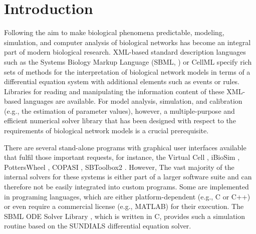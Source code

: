 \documentclass{bioinfo}
\begin{document}
\section{Introduction}

Following the aim to make biological phenomena predictable, modeling, 
simulation, and computer analysis of biological networks has become an integral
part of modern biological research. XML-based standard description languages
such as the Systems Biology Markup Language (SBML, \citealt{Hucka2003}) or
CellML \citep{Lloyd2004} specify rich sets of methods for the interpretation
of biological network models in terms of a differential equation system with
additional elements such as events or rules.
Libraries for reading and manipulating the information content of
these XML-based languages are available.
For model analysis, simulation, and calibration (e.g., the
estimation of parameter values), however, a multiple-purpose and 
efficient numerical solver library that has been designed with respect to the
requirements of biological network models is a crucial prerequisite.

There are several stand-alone programs with
graphical user interfaces available that fulfil those important requests, for
instance, the Virtual Cell \citep{Loew2001}, iBioSim \citep{Myers2009},
PottersWheel \citep{Maiwald2008}, COPASI \citep{Hoops2006}, SBToolbox2
\citep{SBT_Schmidt2006}.
However, The vast majority of the internal solvers for
these systems is either part of a larger software suite and can therefore not
be easily integrated into custom programs. Some are implemented in programing
languages, which are either platform-dependent (e.g., C or C++) or even require
a commercial license (e.g., MATLAB\texttrademark{}) for their execution.
%
%
%
The SBML ODE Solver Library \citep{Machne2006}, which is written in C,
provides such a simulation routine based on the SUNDIALS differential equation
solver.
\end{document}

